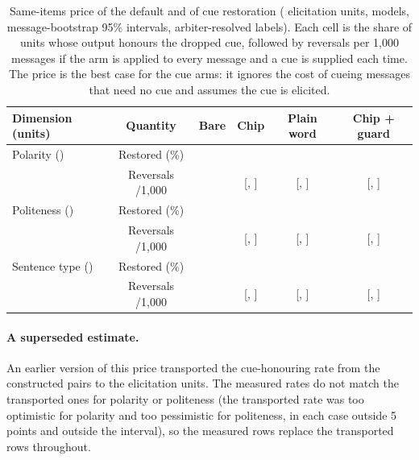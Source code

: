 \begin{table}[t]
\caption{Same-items price of the default and of cue restoration (\jmfOneUnits{} elicitation units, \jmfOneModels{} models, message-bootstrap 95\% intervals, arbiter-resolved labels). Each cell is the share of units whose output honours the dropped cue, followed by reversals per 1,000 messages if the arm is applied to every message and a cue is supplied each time. The price is the best case for the cue arms: it ignores the cost of cueing messages that need no cue and assumes the cue is elicited.}\label{tab:price}
\small
\begin{tabular}{lccccc}
\toprule
Dimension (units) & Quantity & Bare & Chip & Plain word & Chip + guard \\
\midrule
Polarity (\jmfOneUnitsPol{}) & Restored (\%) & \jmfOneRestPolBare{} & \jmfOneRestPolChip{} & \jmfOneRestPolWord{} & \jmfOneRestPolChipG{} \\
 & Reversals /1,000 & \jmfOneRevPolBare{} & \jmfOneRevPolChip{} [\jmfOneRevPolChipLo{}, \jmfOneRevPolChipHi{}] & \jmfOneRevPolWord{} [\jmfOneRevPolWordLo{}, \jmfOneRevPolWordHi{}] & \jmfOneRevPolChipG{} [\jmfOneRevPolChipGLo{}, \jmfOneRevPolChipGHi{}] \\
\addlinespace
Politeness (\jmfOneUnitsPolite{}) & Restored (\%) & \jmfOneRestPoliteBare{} & \jmfOneRestPoliteChip{} & \jmfOneRestPoliteWord{} & \jmfOneRestPoliteChipG{} \\
 & Reversals /1,000 & \jmfOneRevPoliteBare{} & \jmfOneRevPoliteChip{} [\jmfOneRevPoliteChipLo{}, \jmfOneRevPoliteChipHi{}] & \jmfOneRevPoliteWord{} [\jmfOneRevPoliteWordLo{}, \jmfOneRevPoliteWordHi{}] & \jmfOneRevPoliteChipG{} [\jmfOneRevPoliteChipGLo{}, \jmfOneRevPoliteChipGHi{}] \\
\addlinespace
Sentence type (\jmfOneUnitsAct{}) & Restored (\%) & \jmfOneRestActBare{} & \jmfOneRestActChip{} & \jmfOneRestActWord{} & \jmfOneRestActChipG{} \\
 & Reversals /1,000 & \jmfOneRevActBare{} & \jmfOneRevActChip{} [\jmfOneRevActChipLo{}, \jmfOneRevActChipHi{}] & \jmfOneRevActWord{} [\jmfOneRevActWordLo{}, \jmfOneRevActWordHi{}] & \jmfOneRevActChipG{} [\jmfOneRevActChipGLo{}, \jmfOneRevActChipGHi{}] \\
\bottomrule
\end{tabular}
\end{table}

\paragraph{A superseded estimate.}
An earlier version of this price transported the cue-honouring rate from the constructed pairs to the elicitation units. The measured rates do not match the transported ones for polarity or politeness (the transported rate was too optimistic for polarity and too pessimistic for politeness, in each case outside 5 points and outside the interval), so the measured rows replace the transported rows throughout.

